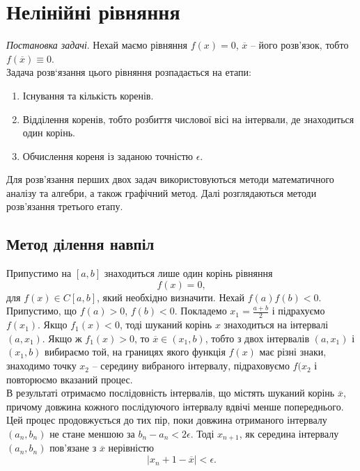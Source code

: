 \section{Нелінійні рівняння}

\textit{Постановка задачі}. Нехай маємо рівняння $f(x) = 0$, $\overline{x}$ -- його розв’язок, тобто $f (\overline{x}) \equiv 0$. \\

Задача розв‘язання цього рівняння розпадається на етапи:
\begin{enumerate}
	\item Існування та кількість коренів.
	\item Відділення коренів, тобто розбиття числової вісі на інтервали, де знаходиться один корінь.
	\item Обчислення кореня із заданою точністю $\epsilon$.
\end{enumerate}

Для розв'язання перших двох задач використовуються методи математичного аналізу та алгебри, а також графічний метод. Далі розглядаються методи розв'язання третього етапу.

\subsection{Метод ділення навпіл}

Припустимо на $[a, b]$ знаходиться лише один корінь рівняння 
\begin{equation}
	\label{eq:2.1}
	f(x) = 0,
\end{equation}
для $f(x) \in C[a,b]$, який необхідно визначити. Нехай $f(a) f (b) < 0$. \\

Припустимо, що $f(a) > 0$, $f(b) < 0$. Покладемо $x_1 = \frac{a + b}{2}$ і підрахуємо
$f(x_1)$. Якщо $f_1(x) < 0$, тоді шуканий корінь $x$ знаходиться на інтервалі $(a, x_1)$. Якщо ж $f_1(x) > 0$, то $\overline{x} \in (x_1, b)$, тобто з двох інтервалів $(a, x_1)$ і $(x_1, b)$ вибираємо той, на границях якого функція $f(x)$ має різні знаки, знаходимо точку $x_2$ -- середину вибраного інтервалу, підраховуємо $f(x_2$ і повторюємо вказаний процес. \\

В результаті отримаємо послідовність інтервалів, що містять шуканий корінь $\overline{x}$, причому довжина кожного послідуючого інтервалу вдвічі менше попереднього. \\

Цей процес продовжується до тих пір, поки довжина отриманого інтервалу $(a_n, b_n)$ не стане меншою за $b_n - a_n < 2 \epsilon$. Тоді $x_{n+1}$, як середина інтервалу $(a_n, b_n)$ пов'язане з $\overline{x}$ нерівністю
\begin{equation}
	\label{eq:2.2}
	|x_n+1 - \overline{x}| < \epsilon.
\end{equation}

